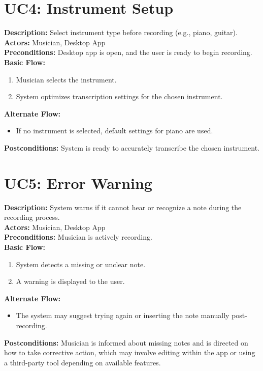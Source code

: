 \documentclass[12pt]{article}
\begin{document}
\section*{UC4: Instrument Setup}
\textbf{Description:} Select instrument type before recording (e.g., piano, guitar). \\
\textbf{Actors:} Musician, Desktop App \\
\textbf{Preconditions:} Desktop app is open, and the user is ready to begin recording. \\
\textbf{Basic Flow:}
\begin{enumerate}
    \item Musician selects the instrument.
    \item System optimizes transcription settings for the chosen instrument.
\end{enumerate}
\textbf{Alternate Flow:}
\begin{itemize}
    \item If no instrument is selected, default settings for piano are used.
\end{itemize}
\textbf{Postconditions:} System is ready to accurately transcribe the chosen instrument.

\section*{UC5: Error Warning}
\textbf{Description:} System warns if it cannot hear or recognize a note during the recording process. \\
\textbf{Actors:} Musician, Desktop App \\
\textbf{Preconditions:} Musician is actively recording. \\
\textbf{Basic Flow:}
\begin{enumerate}
    \item System detects a missing or unclear note.
    \item A warning is displayed to the user.
\end{enumerate}
\textbf{Alternate Flow:}
\begin{itemize}
    \item The system may suggest trying again or inserting the note manually post-recording.
\end{itemize}
\textbf{Postconditions:} Musician is informed about missing notes and is directed on how to take corrective action, which may involve editing within the app or using a third-party tool depending on available features.
\end{document}
